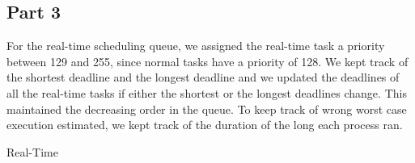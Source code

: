\documentclass[12pt]{article}
\begin{document}
\subsection{Part 3}
For the real-time scheduling queue, we assigned the real-time task a priority between
129 and 255, since normal tasks have a priority of 128. We kept track of the shortest deadline and 
the longest deadline and we updated the deadlines of all the real-time tasks if either
the shortest or the longest deadlines change. This maintained the decreasing order
in the queue. To keep track of wrong worst case execution estimated, we kept track of 
the duration of the long each process ran. 

\begin{algorithm}[!h]
\caption{Real-Time}
\begin{algorithmic}[1]
    \Else{}
    \EndIf{}
    \EndProcedure{}
\end{algorithmic}
\end{algorithm}
\end{document}
